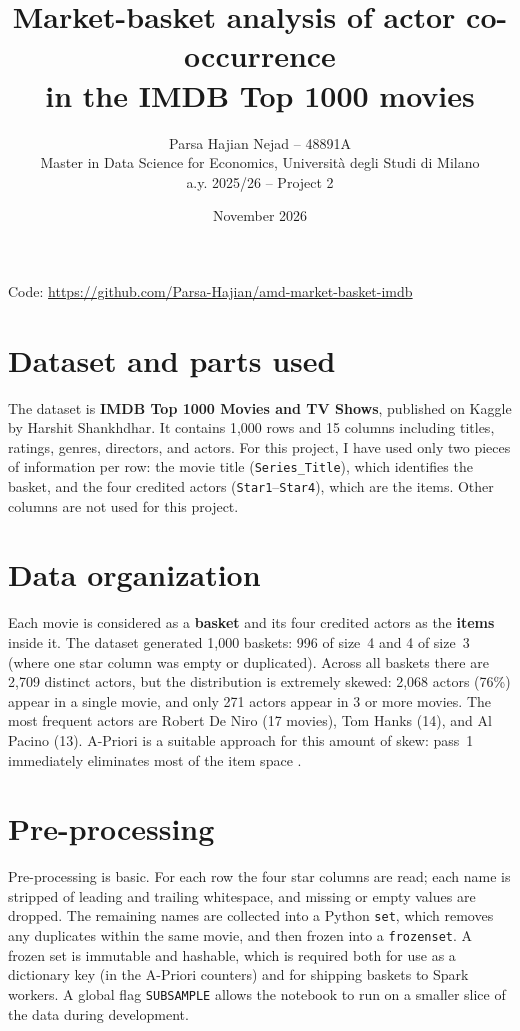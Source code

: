 \documentclass[11pt,a4paper]{article}
\title{Market-basket analysis of actor co-occurrence\\in the IMDB Top 1000 movies}
\author{Parsa Hajian Nejad -- 48891A\\Master in Data Science for Economics, Universit\`a degli Studi di Milano\\
\small  a.y. 2025/26 -- Project 2}
\date{November 2026}
\begin{document}
\maketitle

\noindent Code: \url{https://github.com/Parsa-Hajian/amd-market-basket-imdb}

\section{Dataset and parts used}

The dataset is \textbf{IMDB Top 1000 Movies and TV Shows}, published on Kaggle by Harshit Shankhdhar.
It contains 1,000 rows and 15 columns including titles, ratings, genres, directors, and actors.
For this project, I have used only two pieces of information per row: the movie title (\texttt{Series\_Title}),
which identifies the basket, and the four credited actors (\texttt{Star1}--\texttt{Star4}), which are the items.
Other columns are not used for this project.

\section{Data organization}

Each movie is considered as a \textbf{basket} and its four credited actors as the \textbf{items} inside it.
The dataset generated 1,000 baskets: 996 of size~4 and 4 of size~3 (where one star column was empty or duplicated).
Across all baskets there are 2,709 distinct actors, but the distribution is extremely skewed:
2,068 actors (76\%) appear in a single movie, and only 271 actors appear in 3 or more movies.
The most frequent actors are Robert De Niro (17 movies), Tom Hanks (14), and Al Pacino (13).
A-Priori is a suitable approach for this amount of skew: pass~1 immediately eliminates most of the item space .

\section{Pre-processing}

Pre-processing is basic. For each row the four star columns are read; each name is stripped of leading
and trailing whitespace, and missing or empty values are dropped. The remaining names are collected into a
Python \texttt{set}, which removes any duplicates within the same movie, and then frozen into a
\texttt{frozenset}. A frozen set is immutable and hashable, which is required both for use as a dictionary
key (in the A-Priori counters) and for shipping baskets to Spark workers. A global flag \texttt{SUBSAMPLE}
allows the notebook to run on a smaller slice of the data during development.
\end{document}
